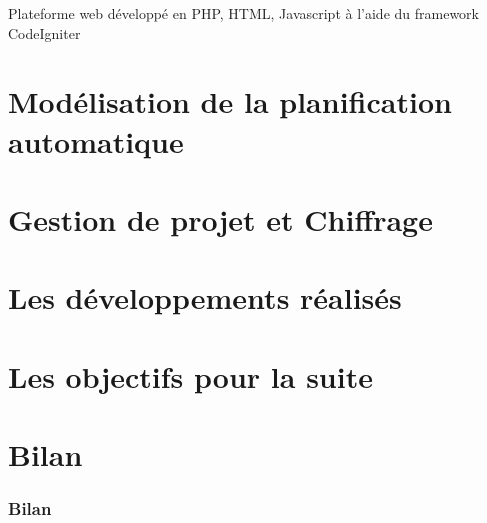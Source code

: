 \documentclass{beamer}
\begin{document}
\begin{frame}

Plateforme web développé en PHP, HTML, Javascript à l'aide du framework CodeIgniter 



\end{frame}



\section{Modélisation de la planification automatique}


\section{Gestion de projet et Chiffrage}


\section{Les développements réalisés}


\section{Les objectifs pour la suite}



\section*{Bilan}

\begin{frame}
\frametitle{Bilan}

\end{frame}
\end{document}
